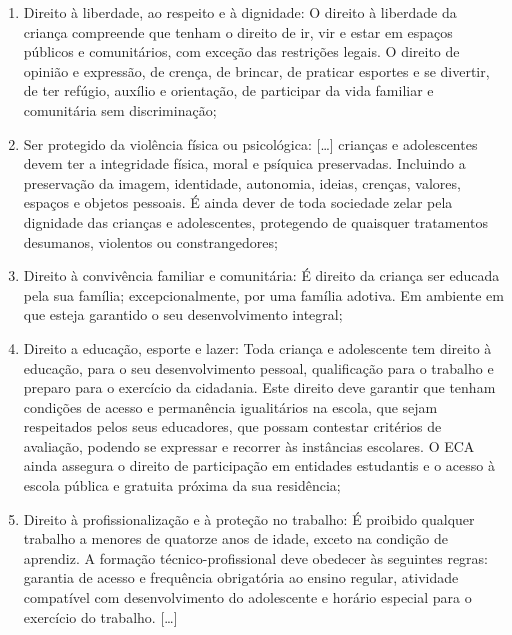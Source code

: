 \begin{enumerate}[label=\textcolor{blue}{\arabic*.}]
\item Direito à liberdade, ao respeito e à dignidade: O direito à
liberdade da criança compreende que tenham o direito de ir, vir e estar
em espaços públicos e comunitários, com exceção das restrições legais. O
direito de opinião e expressão, de crença, de brincar, de praticar
esportes e se divertir, de ter refúgio, auxílio e orientação, de
participar da vida familiar e comunitária sem discriminação;

\item Ser protegido da violência física ou psicológica: {[}\ldots{}{]} crianças e adolescentes devem ter a integridade física, moral
e psíquica preservadas. Incluindo a preservação da imagem, identidade,
autonomia, ideias, crenças, valores, espaços e objetos pessoais. É ainda
dever de toda sociedade zelar pela dignidade das crianças e
adolescentes, protegendo de quaisquer tratamentos desumanos, violentos
ou constrangedores;

\item Direito à convivência familiar e comunitária: É direito da criança
ser educada pela sua família; excepcionalmente, por uma família adotiva.
Em ambiente em que esteja garantido o seu desenvolvimento integral;

\item Direito a educação, esporte e lazer: Toda criança e adolescente tem
direito à educação, para o seu desenvolvimento pessoal, qualificação
para o trabalho e preparo para o exercício da cidadania. Este direito
deve garantir que tenham condições de acesso e permanência igualitários
na escola, que sejam respeitados pelos seus educadores, que possam
contestar critérios de avaliação, podendo se expressar e recorrer às
instâncias escolares. O ECA ainda assegura o direito de participação em
entidades estudantis e o acesso à escola pública e gratuita próxima da
sua residência;

\item Direito à profissionalização e à proteção no trabalho: É proibido
qualquer trabalho a menores de quatorze anos de idade, exceto na
condição de aprendiz. A formação técnico-profissional deve obedecer às
seguintes regras: garantia de acesso e frequência obrigatória ao ensino
regular, atividade compatível com desenvolvimento do adolescente e
horário especial para o exercício do trabalho. {[}\ldots{}{]}
\end{enumerate}


